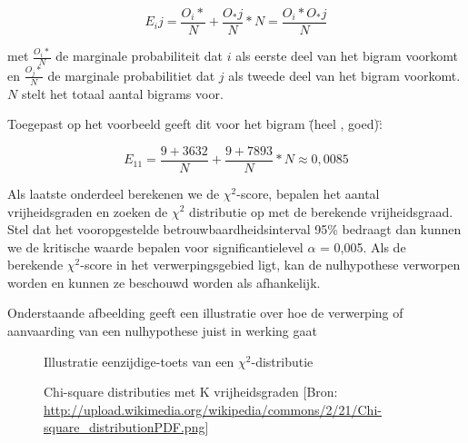 \[{E_ij}= \frac{O_i*}{N} + \frac{O_*j}{N} * N = \frac{O_i* O_*j}{N} \]


met $\frac{O_i*}{N}$ de marginale probabiliteit dat $i$ als eerste deel van het bigram voorkomt en $\frac{O_j*}{N}$ de marginale probabilitiet dat $j$ als tweede deel van het bigram voorkomt. $N$ stelt het totaal aantal bigrams voor.

Toegepast op het voorbeeld geeft dit voor het bigram \"(heel , goed)\":

\[{E_11} = \frac{9+3632}{N}+\frac{9+7893}{N} * N ≈ 0,0085 \]

Als laatste onderdeel berekenen we de ${\chi}^2$-score, bepalen het aantal vrijheidsgraden en zoeken de ${\chi}^2$ distributie op met de berekende vrijheidsgraad. Stel dat het vooropgestelde betrouwbaardheidsinterval 95\% bedraagt dan kunnen we de kritische waarde bepalen voor significantielevel $\alpha$ = 0,005.
Als de berekende ${\chi}^2$-score in het verwerpingsgebied ligt, kan de nulhypothese verworpen worden en kunnen ze beschouwd worden als afhankelijk.

Onderstaande afbeelding geeft een illustratie over hoe de verwerping of aanvaarding van een nulhypothese juist in werking gaat

\begin{figure}%
    \centering
    \caption{Illustratie eenzijdige-toets van een ${\chi}^2$-distributie}%
    \qquad
    \caption{Chi-square distributies met K vrijheidsgraden [Bron: \url{http://upload.wikimedia.org/wikipedia/commons/2/21/Chi-square_distributionPDF.png}]}%
    \label{fig:example}%
\end{figure}
%  


